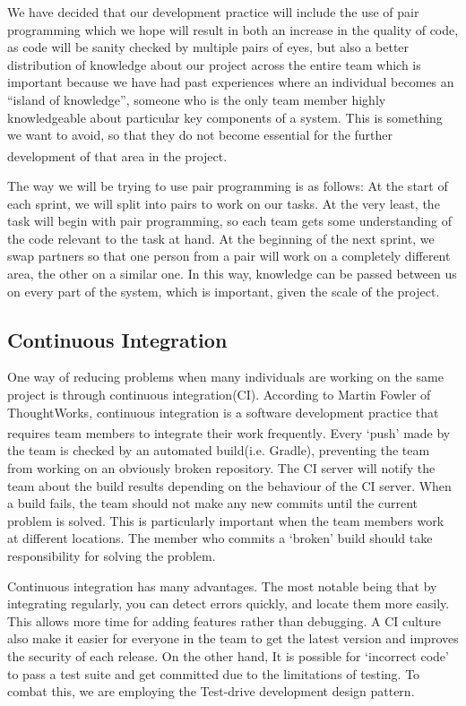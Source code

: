 \documentclass[10pt, a4paper]{article}
\begin{document}
We have decided that our development practice will include the use of pair programming  which we hope will result in both an increase in the quality of code, as code will be sanity checked by multiple pairs of eyes, but also a better distribution of knowledge about our project across the entire team which is important because we have had past experiences where an individual becomes an “island of knowledge”, someone who is the only team member highly knowledgeable about particular key components of a system. This is something we want to avoid, so that they do not become essential for the further development of that area in the project\textsuperscript{\cite{pairprog2}}.

The way we will be trying to use pair programming is as follows:
At the start of each sprint, we will split into pairs to work on our tasks. At the very least, the task will begin with pair programming, so each team gets some understanding of the code relevant to the task at hand. At the beginning of the next sprint, we swap partners so that one person from a pair will work on a completely different area, the other on a similar one. In this way, knowledge can be passed between us on every part of the system, which is important, given the scale of the project.

\subsection{Continuous Integration}

One way of reducing problems when many individuals are working on the same project is through continuous integration(CI). According to Martin Fowler of ThoughtWorks, continuous integration is a software development practice that requires team members to integrate their work frequently\textsuperscript{\cite{continuous1,continuous2}}. Every ‘push’ made by the team is checked by an automated build(i.e. Gradle), preventing the team from working on an obviously broken repository. The CI server will notify the team about the build results depending on the behaviour of the CI server. When a build fails, the team should not make any new commits until the current problem is solved. This is particularly important when the team members work at different locations. The member who commits a ‘broken’ build should take responsibility for solving the problem.

Continuous integration has many advantages. The most notable being that by integrating regularly, you can detect errors quickly, and locate them more easily. This allows more time for adding features rather than debugging. A CI culture also make it easier for everyone in the team to get the latest version and improves the security of each release. On the other hand, It is possible for ‘incorrect code’ to pass a test suite and get committed  due to the limitations of testing. To combat this, we are employing the Test-drive development design pattern. 
\end{document}
